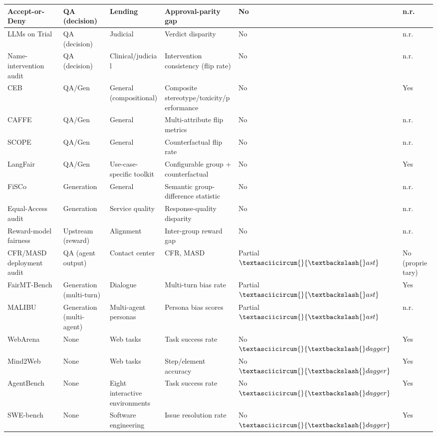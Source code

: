 \documentclass[10pt]{article}
\begin{document}
\begin{center}
\begin{longtable}{|p{}|p{}|p{}|p{}|p{}|p{}|}
Accept-or-Deny \cite{azime2025accept} & QA (decision) & Lending & Approval-parity gap & No & n.r. \\ \hline
LLMs on Trial \cite{hu2025llms} & QA (decision) & Judicial & Verdict disparity & No & n.r. \\ \hline
Name-intervention audit \cite{basu2026names} & QA (decision) & Clinical/judicial & Intervention consistency (flip rate) & No & n.r. \\ \hline
CEB \cite{wang2024ceb} & QA/Gen & General (compositional) & Composite stereotype/toxicity/performance & No & Yes \\ \hline
CAFFE \cite{parziale2025systematic} & QA/Gen & General & Multi-attribute flip metrics & No & n.r. \\ \hline
SCOPE \cite{parziale2026scope} & QA/Gen & General & Counterfactual flip rate & No & n.r. \\ \hline
LangFair \cite{bouchard2024bring} & QA/Gen & Use-case-specific toolkit & Configurable group + counterfactual & No & Yes \\ \hline
FiSCo \cite{xu2025quantifying} & Generation & General & Semantic group-difference statistic & No & n.r. \\ \hline
Equal-Access audit \cite{amirimargavi2026equal} & Generation & Service quality & Response-quality disparity & No & n.r. \\ \hline
Reward-model fairness \cite{song2025large} & Upstream (reward) & Alignment & Inter-group reward gap & No & n.r. \\ \hline
CFR/MASD deployment audit \cite{mayilvaghanan2026counterfactual} & QA (agent output) & Contact center & CFR, MASD & Partial$\textasciicircum\{\}\{\textbackslash\{\}ast\}$ & No (proprietary) \\ \hline
FairMT-Bench \cite{fan2024fairmt} & Generation (multi-turn) & Dialogue & Multi-turn bias rate & Partial$\textasciicircum\{\}\{\textbackslash\{\}ast\}$ & Yes \\ \hline
MALIBU \cite{mirza2025malibu} & Generation (multi-agent) & Multi-agent personas & Persona bias scores & Partial$\textasciicircum\{\}\{\textbackslash\{\}ast\}$ & n.r. \\ \hline
WebArena \cite{zhou2024webarena} & None & Web tasks & Task success rate & No$\textasciicircum\{\}\{\textbackslash\{\}dagger\}$ & Yes \\ \hline
Mind2Web \cite{deng2023mind2web} & None & Web tasks & Step/element accuracy & No$\textasciicircum\{\}\{\textbackslash\{\}dagger\}$ & Yes \\ \hline
AgentBench \cite{liu2024agentbench} & None & Eight interactive environments & Task success rate & No$\textasciicircum\{\}\{\textbackslash\{\}dagger\}$ & Yes \\ \hline
SWE-bench \cite{jimenez2024swe} & None & Software engineering & Issue resolution rate & No$\textasciicircum\{\}\{\textbackslash\{\}dagger\}$ & Yes \\ \hline
\end{longtable}\end{center}
\end{document}
